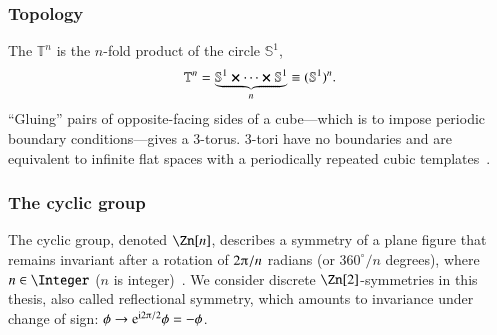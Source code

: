





    \subsubsection{Topology}
    The  $\mathbb{T}^n$ is the $n$-fold product of the circle $\mathbb{S}^1$, %
    ~\citep{lancasterQuantumFieldTheory2014} 
    \begin{equation}
        \mathbb{T}^n = \underbrace{\mathbb{S}^1 \cross \cdots \cross \mathbb{S}^1}_{n} \equiv (\mathbb{S}^1)^n.
    \end{equation}
    ``Gluing'' pairs of opposite-facing sides of a cube---which is to impose periodic boundary conditions---gives a 3-torus. %
    3-tori have no boundaries and are equivalent to infinite flat spaces with a periodically repeated cubic templates~\citep{carrollSpacetimeGeometryIntroduction2019}.
    
    
    
    



    \subsubsection{The cyclic group}
    The cyclic group, denoted $\Zn[n]$, describes a symmetry of a plane figure that remains invariant after a rotation of $2\ppi/n$ radians (or $360^\circ/n$ degrees), where $n\in \Integer$ ($n$ is integer)~\citep{lancasterQuantumFieldTheory2014}. We consider discrete $\Zn[2]$-symmetries in this thesis, also called reflectional symmetry, which amounts to invariance under change of sign: $\phi \to\eu[\im 2\ppi/2] \phi  = -\phi$.








